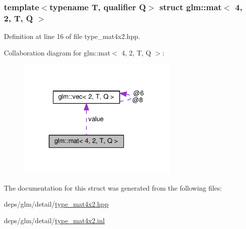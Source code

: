 \subsubsection*{template$<$typename T, qualifier Q$>$\newline
struct glm\+::mat$<$ 4, 2, T, Q $>$}



Definition at line 16 of file type\+\_\+mat4x2.\+hpp.



Collaboration diagram for glm\+:\+:mat$<$ 4, 2, T, Q $>$\+:
\nopagebreak
\begin{figure}[H]
\begin{center}
\leavevmode
\includegraphics[width=226pt]{d5/df1/structglm_1_1mat_3_014_00_012_00_01T_00_01Q_01_4__coll__graph}
\end{center}
\end{figure}


The documentation for this struct was generated from the following files\+:\begin{DoxyCompactItemize}
\item 
deps/glm/detail/\hyperlink{type__mat4x2_8hpp}{type\+\_\+mat4x2.\+hpp}\item 
deps/glm/detail/\hyperlink{type__mat4x2_8inl}{type\+\_\+mat4x2.\+inl}\end{DoxyCompactItemize}
